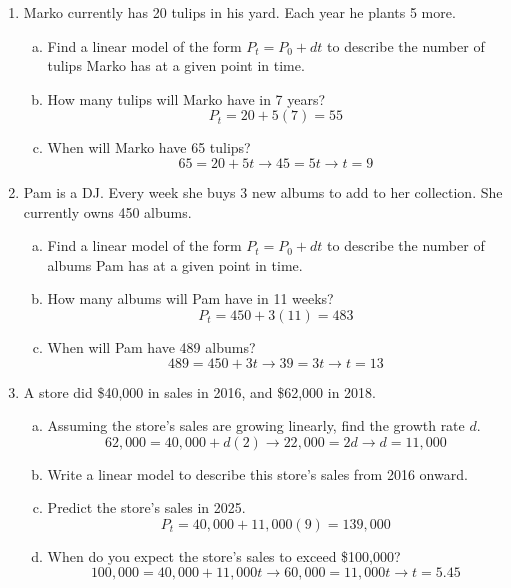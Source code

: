 \begin{enumerate}
\item Marko currently has 20 tulips in his yard.  Each year he plants 5 more.
\begin{enumerate}[(a)]
\item Find a linear model of the form $P_t = P_0 + dt$ to describe the number of tulips Marko has at a given point in time. 
\item How many tulips will Marko have in 7 years? 
\[P_t = 20 + 5(7) = 55\]
\item When will Marko have 65 tulips? 
\[65 = 20 + 5t \longrightarrow 45 = 5t \longrightarrow t = 9\]
\end{enumerate}

\item Pam is a DJ.  Every week she buys 3 new albums to add to her collection.  She currently owns 450 albums.
\begin{enumerate}[(a)]
\item Find a linear model of the form $P_t = P_0 + dt$ to describe the number of albums Pam has at a given point in time. 
\item How many albums will Pam have in 11 weeks? 
\[P_t = 450 + 3(11) = 483\]
\item When will Pam have 489 albums? 
\[489 = 450 + 3t \longrightarrow 39 = 3t \longrightarrow t = 13\]
\end{enumerate}

\item A store did \$40,000 in sales in 2016, and \$62,000 in 2018.
\begin{enumerate}[(a)]
\item Assuming the store's sales are growing linearly, find the growth rate $d$. 
\[62,000 = 40,000 + d(2) \longrightarrow 22,000 = 2d \longrightarrow d = 11,000\]
\item Write a linear model to describe this store's sales from 2016 onward. 
\item Predict the store's sales in 2025. 
\[P_t = 40,000 + 11,000(9) = 139,000\]
\item When do you expect the store's sales to exceed \$100,000? 
\[100,000 = 40,000 + 11,000t \longrightarrow 60,000 = 11,000t \longrightarrow t = 5.45\]
\end{enumerate}


\end{enumerate}
